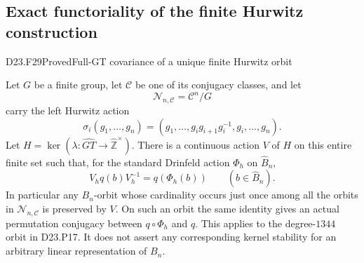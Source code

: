 \subsection{Exact functoriality of the finite Hurwitz construction}

\begin{statement}{D23.F29}{Proved}{Full-GT covariance of a unique finite Hurwitz orbit}
\end{statement}
Let $G$ be a finite group, let $\mathcal C$ be one of its conjugacy
classes, and let
\[
 \mathcal N_{n,\mathcal C}=\mathcal C^n/G
\]
carry the left Hurwitz action
\[
 \sigma_i(g_1,\ldots,g_n)=
 (g_1,\ldots,g_i g_{i+1}g_i^{-1},g_i,\ldots,g_n).
\]
Let $H=\ker(\lambda:\widehat{GT}\to\widehat{\mathbb Z}^{\times})$.
There is a continuous action $V$ of $H$ on this entire finite set
such that, for the standard Drinfeld action $\Phi_h$ on
$\widehat B_n$,
\[
 V_h q(b)V_h^{-1}=q(\Phi_h(b))\qquad(b\in\widehat B_n).
\]
In particular any $B_n$-orbit whose cardinality occurs just once
among all the orbits in $\mathcal N_{n,\mathcal C}$ is preserved
by $V$. On such an orbit the same identity gives an actual
permutation conjugacy between $q\circ\Phi_h$ and $q$.
This applies to the degree-$1344$ orbit in D23.P17. It does not
assert any corresponding kernel stability for an arbitrary
linear representation of $B_n$.


